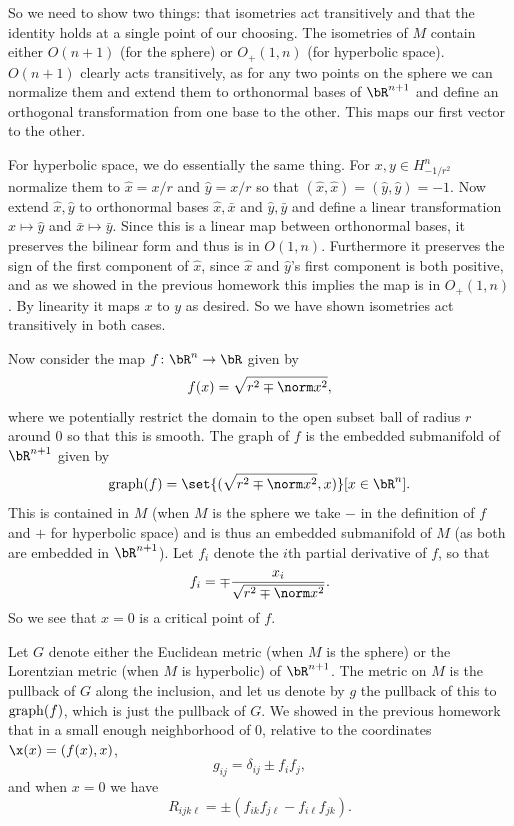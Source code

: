     So we need to show two things: that isometries act transitively and that the identity holds at a single point of our choosing.
    The isometries of $M$ contain either $O(n+1)$ (for the sphere) or $O_+(1,n)$ (for hyperbolic space).
    $O(n+1)$ clearly acts transitively, as for any two points on the sphere we can normalize them and extend them to orthonormal bases of $\bR^{n+1}$ and define an orthogonal transformation from one base to the
    other.
    This maps our first vector to the other.

    For hyperbolic space, we do essentially the same thing.
    For $x,y\in H^n_{-1/r^2}$ normalize them to $\hat x=x/r$ and $\hat y=x/r$ so that $(\hat x,\hat x)=(\hat y,\hat y)=-1$.
    Now extend $\hat x,\hat y$ to orthonormal bases $\hat x,\bar x$ and $\hat y,\bar y$ and define a linear transformation $\hat x\mapsto\hat y$ and $\bar x\mapsto\bar y$.
    Since this is a linear map between orthonormal bases, it preserves the bilinear form and thus is in $O(1,n)$.
    Furthermore it preserves the sign of the first component of $\hat x$, since $\hat x$ and $\hat y$'s first component is both positive, and as we showed in the previous homework this implies the map
    is in $O_+(1,n)$.
    By linearity it maps $x$ to $y$ as desired.
    So we have shown isometries act transitively in both cases.

    \def\grph{{\rm graph}}
    Now consider the map $f\colon\bR^n\to\bR$ given by
    $$ f(x) = \sqrt{r^2 \mp \norm x^2} , $$
    where we potentially restrict the domain to the open subset ball of radius $r$ around $0$ so that this is smooth.
    The graph of $f$ is the embedded submanifold of $\bR^{n+1}$ given by
    $$ \grph(f) = \set{(\sqrt{r^2\mp\norm x^2},x)}[x\in\bR^n] . $$
    This is contained in $M$ (when $M$ is the sphere we take $-$ in the definition of $f$ and $+$ for hyperbolic space) and is thus an embedded submanifold of $M$ (as both are embedded in $\bR^{n+1}$).
    Let $f_i$ denote the $i$th partial derivative of $f$, so that
    $$ f_i = \mp\frac{x_i}{\sqrt{r^2\mp\norm x^2}} . $$
    So we see that $x=0$ is a critical point of $f$.

    Let $G$ denote either the Euclidean metric (when $M$ is the sphere) or the Lorentzian metric (when $M$ is hyperbolic) of $\bR^{n+1}$.
    The metric on $M$ is the pullback of $G$ along the inclusion, and let us denote by $g$ the pullback of this to $\grph(f)$, which is just the pullback of $G$.
    We showed in the previous homework that in a small enough neighborhood of $0$, relative to the coordinates $\x(x)=(f(x),x)$,
    $$ g_{ij} = \delta_{ij} \pm f_if_j, $$
    and when $x=0$ we have
    $$ R_{ijk\ell} = \pm(f_{ik}f_{j\ell} - f_{i\ell}f_{jk}) . $$

